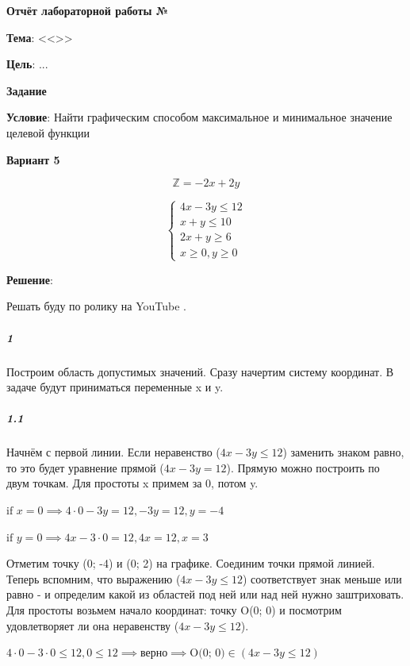 \begin{center}
  \textbf{Отчёт лабораторной работы №\envReportLabNumber}
\end{center}

\textbf{Тема}:
<<\envReportTitle>>

\textbf{Цель}: ...


\begin{center}
  \textbf{Задание}
\end{center}

\textbf{Условие}:
Найти графическим способом максимальное и минимальное значение целевой функции

\begin{center}
  \textbf{Вариант 5}
\end{center}

$$
\mathbb{Z} = -2 x +2 y
$$

$$
\begin{cases}
  4x - 3 y  \leq 12\\
  x + y \leq 10 \\
  2 x + y \geq 6\\
  x \geq 0, y \geq 0
\end{cases}
$$

\textbf{Решение}:

Решать буду по ролику на YouTube \cite{Youtube}.

\subparagraph{1}
Построим область допустимых значений.
Сразу начертим систему координат.
В задаче будут приниматься переменные x и y.

\subparagraph{1.1}
Начнём с первой линии.
Если неравенство ($4x - 3 y  \leq 12$) заменить знаком равно, то это будет уравнение прямой ($4x - 3 y  = 12$).
Прямую можно построить по двум точкам.
Для простоты x примем за 0, потом y.

$
\text{if } x = 0 \implies 4 \cdot 0 - 3 y = 12, -3y = 12, y=-4
$

$
\text{if } y = 0 \implies 4 x - 3 \cdot 0 = 12, 4x=12, x=3
$

Отметим точку (0; -4) и (0; 2) на графике.
Соединим точки прямой линией.
Теперь вспомним, что выражению ($4x - 3 y  \leq 12$) соответствует знак меньше или равно
- и определим какой из областей под ней или над ней нужно заштриховать.
Для простоты возьмем начало координат: точку O(0; 0)
и посмотрим удовлетворяет ли она неравенству ($4x - 3 y  \leq 12$).

$
4 \cdot 0 - 3 \cdot 0  \leq 12, 0 \leq 12 \implies \text{верно} \implies \text{O(0; 0)} \in (4x-3y\leq 12)
$

